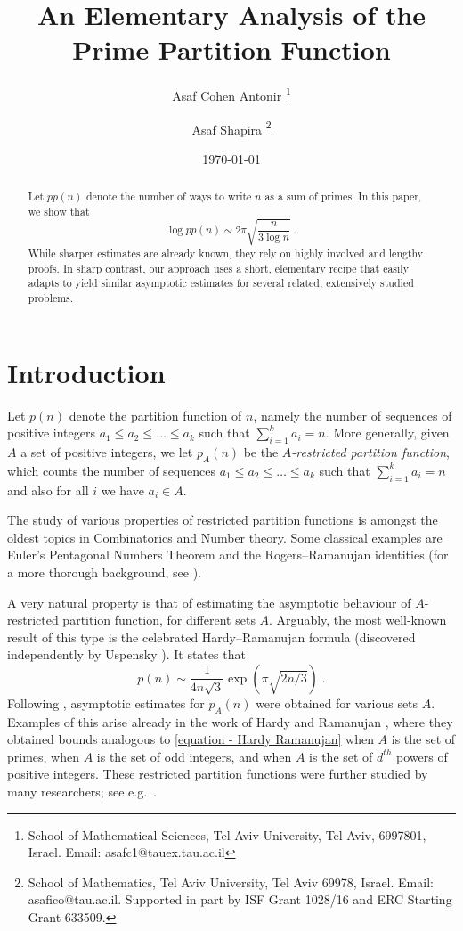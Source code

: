 \documentclass[11pt]{article}
\title{An Elementary Analysis of the Prime Partition Function}
\author{Asaf Cohen Antonir \thanks{School of Mathematical Sciences, Tel Aviv University, Tel Aviv, 6997801, Israel.
Email: asafc1$@$tauex.tau.ac.il} \and Asaf Shapira \thanks{
School of Mathematics, Tel Aviv University, Tel Aviv 69978, Israel.
Email: asafico$@$tau.ac.il. Supported in part by ISF Grant 1028/16 and ERC Starting Grant 633509.}}
\date{\today}
\theoremstyle{plain}
\begin{document}
\date{}
\maketitle

\begin{abstract}
Let $pp (n)$ denote the
number of ways to write $n$ as a sum of primes. In this paper, we show that
$$ 
\log pp (n) \sim 2\pi\sqrt{\frac{n}{3\log n}}\;.
$$
While sharper estimates are already known, they rely on highly involved and lengthy proofs. In sharp contrast, our approach uses a short, elementary recipe that easily adapts to yield similar asymptotic estimates for several related, extensively studied problems.
\end{abstract}


\section{Introduction}\label{sec:intro}


Let $p(n)$ denote the partition function of $n$, namely the number of sequences of positive integers $a_1\leq a_2\leq \ldots\leq a_k$ such that $\sum_{i=1}^{k}a_i=n$.
More generally, given $A$ a set of positive integers, we let $p_A(n)$ be the \emph{$A$-restricted partition function}, which counts the number of sequences $a_1\leq a_2\leq \ldots \leq a_k$ such that $\sum_{i=1}^{k}a_i=n$ and also for all $i$ we have $a_i\in A$.

The study of various properties
of restricted partition functions is amongst the oldest topics in Combinatorics and Number theory. Some classical examples are Euler's Pentagonal Numbers Theorem and the Rogers--Ramanujan identities (for a more thorough background, see \cite{Andrews1976,Andrews1976-1}).

A very natural property is that of estimating the asymptotic behaviour of $A$-restricted partition function, for different sets $A$.
Arguably, the most well-known result of this type is the celebrated Hardy--Ramanujan \cite{HR2} formula (discovered independently by Uspensky \cite{Usp1920}). It states that
\begin{equation}\label{equation - Hardy Ramanujan}
    p(n) \sim \frac{1}{4n\sqrt{3}} \exp(\pi\sqrt{2n/3})\;.
\end{equation}
Following \cite{HR2}, asymptotic estimates for $p_A(n)$ were obtained for various sets $A$. Examples of this arise already in the work of Hardy and Ramanujan \cite{HR1}, where they obtained bounds analogous to \eqref{equation - Hardy Ramanujan} when $A$ is the set of primes, when $A$ is the set of odd integers, and when $A$ is the set of $d^{th}$ powers of positive integers. These restricted partition functions were further studied by many researchers; see e.g.\ \cite{Gaf2016, Gaf2021, YaLWu2021, YaLChen2016, YaLChen2018}.
\end{document}
